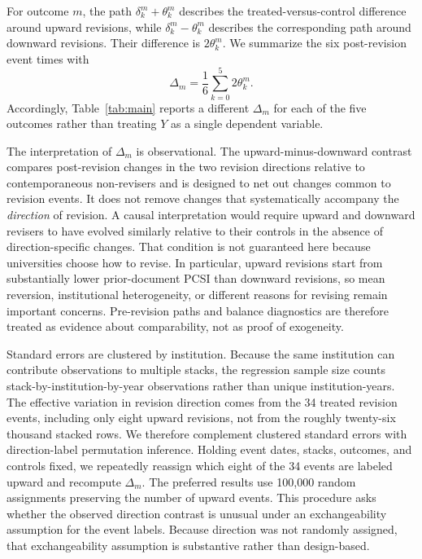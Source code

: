 For outcome $m$, the path $\delta^{m}_k+\theta^{m}_k$ describes the treated-versus-control difference around upward revisions, while $\delta^{m}_k-\theta^{m}_k$ describes the corresponding path around downward revisions. Their difference is $2\theta^{m}_k$. We summarize the six post-revision event times with
\begin{equation}
\Delta_m=\frac{1}{6}\sum_{k=0}^{5}2\theta^{m}_k.
\label{eq:delta}
\end{equation}
Accordingly, Table~\ref{tab:main} reports a different $\Delta_m$ for each of the five outcomes rather than treating $Y$ as a single dependent variable.

The interpretation of $\Delta_m$ is observational. The upward-minus-downward contrast compares post-revision changes in the two revision directions relative to contemporaneous non-revisers and is designed to net out changes common to revision events. It does not remove changes that systematically accompany the \emph{direction} of revision. A causal interpretation would require upward and downward revisers to have evolved similarly relative to their controls in the absence of direction-specific changes. That condition is not guaranteed here because universities choose how to revise. In particular, upward revisions start from substantially lower prior-document PCSI than downward revisions, so mean reversion, institutional heterogeneity, or different reasons for revising remain important concerns. Pre-revision paths and balance diagnostics are therefore treated as evidence about comparability, not as proof of exogeneity.

Standard errors are clustered by institution. Because the same institution can contribute observations to multiple stacks, the regression sample size counts stack-by-institution-by-year observations rather than unique institution-years. The effective variation in revision direction comes from the 34 treated revision events, including only eight upward revisions, not from the roughly twenty-six thousand stacked rows. We therefore complement clustered standard errors with direction-label permutation inference. Holding event dates, stacks, outcomes, and controls fixed, we repeatedly reassign which eight of the 34 events are labeled upward and recompute $\Delta_m$. The preferred results use 100,000 random assignments preserving the number of upward events. This procedure asks whether the observed direction contrast is unusual under an exchangeability assumption for the event labels. Because direction was not randomly assigned, that exchangeability assumption is substantive rather than design-based.

